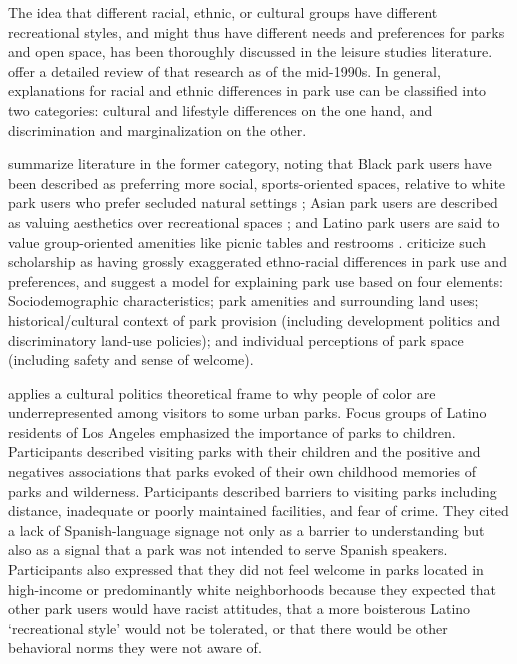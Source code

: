 \documentclass[3p, authoryear, review]{elsarticle} %
\begin{document}
The idea that different racial, ethnic, or cultural groups have different recreational styles, and might thus have different needs and preferences for parks and open space, has been thoroughly discussed in the leisure studies literature. \citet{husbands1995ethnicity} offer a detailed review of that research as of the mid-1990s. In general, explanations for racial and ethnic differences in park use can be classified into two categories: cultural and lifestyle differences on the one hand, and discrimination and marginalization on the other.

\citet{byrne2009nature} summarize literature in the former category, noting that Black park users have been described as preferring more social, sports-oriented spaces, relative to white park users who prefer secluded natural settings \citep{washburne1978black, hutchison1987ethnicity, floyd1999convergence, gobster2002managing, payne2002examination, ho2005gender}; Asian park users are described as valuing aesthetics over recreational spaces \citep{gobster2002managing, payne2002examination, ho2005gender}; and Latino park users are said to value group-oriented amenities like picnic tables and restrooms \citep{baas1993influence, hutchison1987ethnicity, irwin1990mexican}. \citet{byrne2009nature} criticize such scholarship as having grossly exaggerated ethno-racial differences in park use and preferences, and suggest a model for explaining park use based on four elements: Sociodemographic characteristics; park amenities and surrounding land uses; historical/cultural context of park provision (including development politics and discriminatory land-use policies); and individual perceptions of park space (including safety and sense of welcome).

\citet{byrne2012green} applies a cultural politics theoretical frame to why people of color are underrepresented among visitors to some urban parks. Focus groups of Latino residents of Los Angeles emphasized the importance of parks to children. Participants described visiting parks with their children and the positive and negatives associations that parks evoked of their own childhood memories of parks and wilderness. Participants described barriers to visiting parks including distance, inadequate or poorly maintained facilities, and fear of crime. They cited a lack of Spanish-language signage not only as a barrier to understanding but also as a signal that a park was not intended to serve Spanish speakers. Participants also expressed that they did not feel welcome in parks located in high-income or predominantly white neighborhoods because they expected that other park users would have racist attitudes, that a more boisterous Latino `recreational style' would not be tolerated, or that there would be other behavioral norms they were not aware of.
\end{document}
